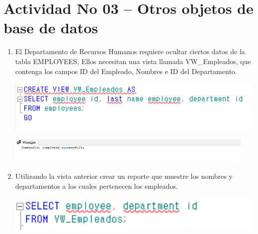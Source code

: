\section{Actividad No 03 –  Otros objetos de base de datos} 
		
\begin{enumerate}[1.]
	\item El Departamento de Recursos Humanos requiere ocultar ciertos datos de la tabla EMPLOYEES, Ellos necesitan una vista llamada VW\_Empleados, que contenga los campos ID del Empleado, Nombres e ID del Departamento.
	\\
	\begin{center}
	\includegraphics[width=15cm]{./Imagenes/activ3_1}
	\end{center}

	\begin{center}
	\includegraphics[width=12cm]{./Imagenes/actividad_03_01}
	\end{center}
	
	\item Utilizando la vista anterior crear un reporte que muestre los nombres y departamentos a los cuales
pertenecen los empleados.
	\\
	\begin{center}
	\includegraphics[width=15cm]{./Imagenes/activ3_2}
	\end{center}
	

\end{enumerate}
